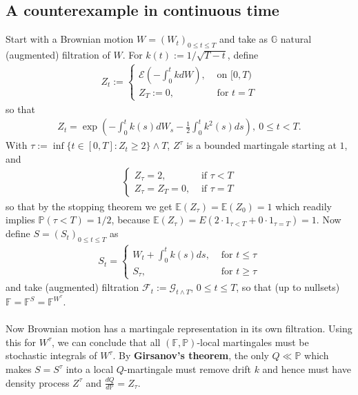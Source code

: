 \documentclass[12pt,a4paper, twoside]{article}
\theoremstyle{definition}
\newcommand{\EE}{\mathbb{E}} %
\newcommand{\PP}{\mathbb{P}} %
\begin{document}
\subsection{A counterexample in continuous time}
Start with a Brownian motion $W=(W_t)_{0 \leq t \leq T}$ and take as $\mathbb{G}$ natural (augmented) filtration of $W$. For $k(t):= 1/\sqrt{T-t}$, define 
\begin{align*}
Z_t := \begin{cases} \mathcal{E} \left( - \int_0^t k dW \right), & \text{ on } [0,T) \\ Z_T:= 0, & \text{ for } t=T
\end{cases}
\end{align*}
so that 
\begin{align*}
Z_t = \exp \left( - \int_0^t k(s) dW_s - \frac{1}{2} \int_0^t k^2 (s) ds \right),  \ 0 \leq t < T.
\end{align*}
With $\tau := \inf \{ t \in [0,T] : Z_t \geq 2 \} \wedge T$, $Z^\tau$ is a bounded martingale starting at $1$, and 
\begin{align*}
\begin{cases} Z_ \tau = 2, & \text{ if } \tau < T \\
Z_\tau = Z_T=0, & \text{ if } \tau = T
\end{cases}
\end{align*}
so that by the stopping theorem we get $\EE(Z_\tau) = \EE(Z_0)=1$ which readily implies $\mathbb{P}( \tau < T)=1/2$, because $\EE(Z_\tau)= E(2\cdot 1_{\tau < T} + 0 \cdot 1_{ \tau = T})=1$. Now define $S=(S_t)_{0 \leq t \leq T}$ as 
\begin{align*}
S_t = \begin{cases} W_t + \int_0^t k(s) ds, & \text{ for } t \leq \tau \\ S_\tau, & \text{ for } t \geq \tau \end{cases}
\end{align*}
and take (augmented) filtration $\mathcal{F}_t:= \mathcal{G}_{t \wedge T}$, $0 \leq t \leq T$, so that (up to nullsets) $\mathbb{F}= \mathbb{F}^S = \mathbb{F}^{W^\tau}$. \\
\\
Now Brownian motion has a martingale representation in its own filtration. Using this for $W^\tau$, we can conclude that all $( \mathbb{F}, \PP)$-local martingales must be stochastic integrals of $W^\tau$. By \textbf{Girsanov's theorem}, the only $Q \ll \PP$ which makes $S= S^\tau$ into a local $Q$-martingale must remove drift $k$ and hence must have density process $Z^\tau$ and $ \frac{dQ}{d\PP}= Z_\tau$. \\
\end{document}
